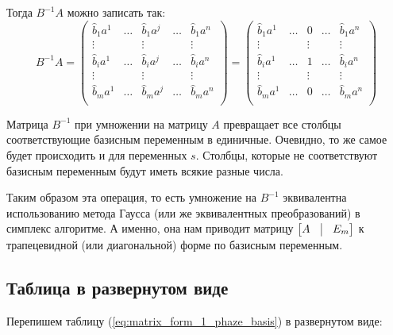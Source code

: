 \documentclass[a4paper,article,14pt]{extarticle}
\begin{document}
Тогда \(B^{-1}A\) можно записать так:
\begin{equation}
    B^{-1}A =
    \begin{pmatrix}
        \hat b_1a^1 & \ldots & \hat b_1a^j & \ldots & \hat b_1a^n \\
        \vdots & & \vdots & & \vdots \\
        \hat b_ia^1 & \ldots & \hat b_ia^j & \ldots & \hat b_ia^n \\
        \vdots & & \vdots & & \vdots \\
        \hat b_ma^1 & \ldots & \hat b_ma^j & \ldots & \hat b_ma^n \\
    \end{pmatrix}
    =
    \begin{pmatrix}
        \hat b_1a^1 & \ldots & 0 & \ldots & \hat b_1a^n \\
        \vdots & & \vdots & & \vdots \\
        \hat b_ia^1 & \ldots & 1 & \ldots & \hat b_ia^n \\
        \vdots & & \vdots & & \vdots \\
        \hat b_ma^1 & \ldots & 0 & \ldots & \hat b_ma^n \\
    \end{pmatrix}
\end{equation}

Матрица \(B^{-1}\) при умножении на матрицу \(A\) превращает все столбцы соответствующие базисным переменным в единичные.
Очевидно, то же самое будет происходить и для переменных \(s\).
Столбцы, которые не соответствуют базисным переменным будут иметь всякие разные числа.

Таким образом эта операция, то есть умножение на \(B^{-1}\) эквивалентна использованию метода Гаусса (или же эквивалентных преобразований) в симплекс алгоритме.
А именно, она нам приводит матрицу \(
    \begin{bmatrix}
        A & \vline & E_m
    \end{bmatrix}
\) к трапецевидной (или диагональной) форме по базисным переменным.

\subsection{Таблица в развернутом виде}

Перепишем таблицу (\ref{eq:matrix_form_1_phaze_basis}) в развернутом виде:
\end{document}

